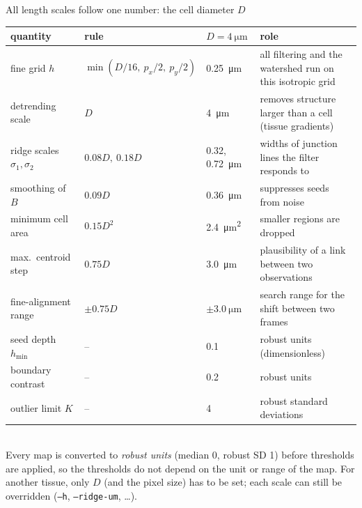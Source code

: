 \documentclass[aspectratio=169,9pt]{beamer}
\begin{document}
\begin{frame}{All length scales follow one number: the cell diameter $D$}
\small
\begin{tabularx}{\textwidth}{@{}l l l X@{}}
\toprule
quantity & rule & $D=\SI{4}{\micro\metre}$ & role\\
\midrule
fine grid $h$ & $\min(D/16,\ p_x/2,\ p_y/2)$ & \SI{0.25}{\micro\metre} & all filtering and the watershed run on this isotropic grid\\
detrending scale & $D$ & \SI{4}{\micro\metre} & removes structure larger than a cell (tissue gradients)\\
ridge scales $\sigma_1,\sigma_2$ & $0.08D,\ 0.18D$ & \SI{0.32}{}, \SI{0.72}{\micro\metre} & widths of junction lines the filter responds to\\
smoothing of $B$ & $0.09D$ & \SI{0.36}{\micro\metre} & suppresses seeds from noise\\
minimum cell area & $0.15D^2$ & \SI{2.4}{\micro\metre\squared} & smaller regions are dropped\\
max.\ centroid step & $0.75D$ & \SI{3.0}{\micro\metre} & plausibility of a link between two observations\\
fine-alignment range & $\pm0.75D$ & $\pm\SI{3.0}{\micro\metre}$ & search range for the shift between two frames\\
\midrule
seed depth $h_\text{min}$ & -- & 0.1 & robust units (dimensionless)\\
boundary contrast & -- & 0.2 & robust units\\
outlier limit $K$ & -- & 4 & robust standard deviations\\
\bottomrule
\end{tabularx}\\[6pt]
Every map is converted to \emph{robust units} (median 0, robust SD 1) before thresholds are applied, so the thresholds do not depend on the unit or range of the map.
For another tissue, only $D$ (and the pixel size) has to be set; each scale can still be overridden (\texttt{--h}, \texttt{--ridge-um}, \dots).
\end{frame}
\end{document}
